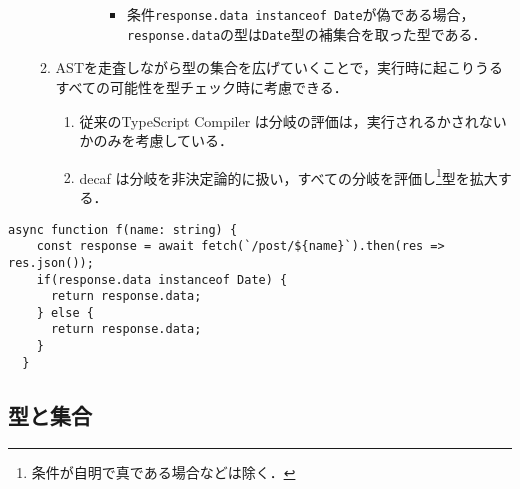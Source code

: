 \begin{enumerate}
\begin{enumerate}
\begin{enumerate}
\begin{itemize}
\begin{itemize}
                                            \item 条件\texttt{response.data instanceof Date}が偽である場合，\texttt{response.data}の型は\texttt{Date}型の補集合を取った型である．
                                        \end{itemize}
                              \end{itemize}
                    \end{enumerate}
              \item ASTを走査しながら型の集合を広げていくことで，実行時に起こりうるすべての可能性を型チェック時に考慮できる．
                    \begin{enumerate}
                        \item 従来のTypeScript Compiler は分岐の評価は，実行されるかされないかのみを考慮している．
                        \item decaf は分岐を非決定論的に扱い，すべての分岐を評価し\footnote{条件が自明で真である場合などは除く．}型を拡大する．
                    \end{enumerate}
          \end{enumerate}
\end{enumerate}

\begin{lstlisting}[caption=例, label=lst:example]
  async function f(name: string) {
    const response = await fetch(`/post/${name}`).then(res => res.json());
    if(response.data instanceof Date) {
      return response.data;
    } else {
      return response.data;
    }
  }
\end{lstlisting}

\subsection{型と集合}
\label{sec:type-and-set}
